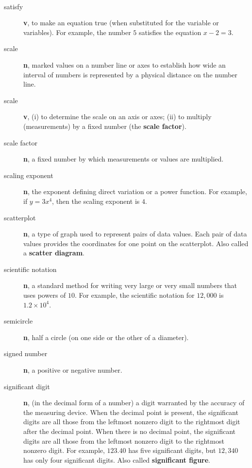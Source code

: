 \documentclass[10pt,]{book}
\newcommand{\terminology}[1]{\textbf{#1}}
\theoremstyle{plain}
\theoremstyle{definition}
\theoremstyle{definition}
\theoremstyle{definition}
\numberwithin{equation}{part}
\begin{document}
\paragraph[{}]{}\hypertarget{paragraphs-22}{}
\leavevmode%
\begin{description}
\item[{satisfy}]\hypertarget{li-787}{}\terminology{v}, to make an equation true (when substituted for the variable or variables). For example, the number \(5\) satisfies the equation \(x − 2 = 3\).%
\item[{scale}]\hypertarget{li-788}{}\terminology{n}, marked values on a number line or axes to establish how wide an interval of numbers is represented by a physical distance on the number line.%
\item[{scale}]\hypertarget{li-789}{}\terminology{v}, (i) to determine the scale on an axis or axes; (ii) to multiply (measurements) by a fixed number (the \terminology{scale factor}).%
\item[{scale factor}]\hypertarget{li-790}{}\terminology{n}, a fixed number by which measurements or values are multiplied.%
\item[{scaling exponent}]\hypertarget{li-791}{}\terminology{n}, the exponent defining direct variation or a power function. For example, if \(y = 3x^4\), then the scaling exponent is \(4\).%
\item[{scatterplot}]\hypertarget{li-792}{}\terminology{n}, a type of graph used to represent pairs of data values. Each pair of data values provides the coordinates for one point on the scatterplot. Also called a \terminology{scatter diagram}.%
\item[{scientific notation}]\hypertarget{li-793}{}\terminology{n}, a standard method for writing very large or very small numbers that uses powers of \(10\). For example, the scientific notation for \(12,000\) is \(1.2\times 10^4\).%
\item[{semicircle}]\hypertarget{li-794}{}\terminology{n}, half a circle (on one side or the other of a diameter).%
\item[{signed number}]\hypertarget{li-795}{}\terminology{n}, a positive or negative number.%
\item[{significant digit}]\hypertarget{li-796}{}\terminology{n}, (in the decimal form of a number) a digit warranted by the accuracy of the measuring device. When the decimal point is present, the significant digits are all those from the leftmost nonzero digit to the rightmost digit after the decimal point. When there is no decimal point, the significant digits are all those from the leftmost nonzero digit to the rightmost nonzero digit. For example, \(123.40\) has five significant digits, but \(12,340\) has only four significant digits. Also called \terminology{significant figure}.%

\end{description}
\end{document}
